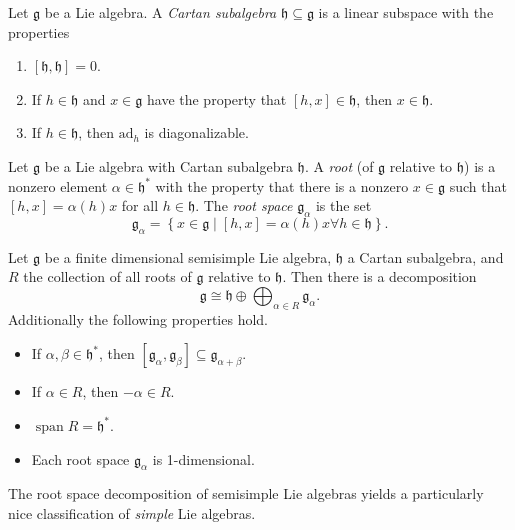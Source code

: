 \documentclass[11pt, letterpaper]{article}
\theoremstyle{plain}
\begin{document}
\begin{definition}\label{dfn:2-4}
	Let $\mathfrak{g} $ be a Lie algebra. A \emph{Cartan subalgebra} $\mathfrak{h} \subseteq \mathfrak{g} $ is a linear subspace with the properties
	\begin{enumerate}[label=(\arabic*), align=right]
		\item $[\mathfrak{h} ,\mathfrak{h} ]=0$.
		\item If $h\in \mathfrak{h} $ and $x\in \mathfrak{g} $ have the property that $[h,x]\in \mathfrak{h} $, then $x\in \mathfrak{h} $.
		\item If $h\in \mathfrak{h} $, then $\mathrm{ad}_h$ is diagonalizable.
	\end{enumerate}
\end{definition}
\begin{definition}\label{dfn:2-5}
	Let $\mathfrak{g} $ be a Lie algebra with Cartan subalgebra $\mathfrak{h} $. A \emph{root} (of $\mathfrak{g} $ relative to $\mathfrak{h} $) is a nonzero element $\alpha \in \mathfrak{h} ^*$ with the property that there is a nonzero $x\in \mathfrak{g} $ such that $[h,x]=\alpha (h)x$ for all $h\in \mathfrak{h} $. The \emph{root space} $\mathfrak{g} _{\alpha } $ is the set
	\[
		\mathfrak{g} _{\alpha } =\left\{ x\in \mathfrak{g} \mid [h,x]=\alpha (h)x \forall h\in \mathfrak{h}  \right\} 
	.\]
\end{definition}
\begin{proposition}\label{prp:2-6}
	Let $\mathfrak{g} $ be a finite dimensional semisimple Lie algebra, $\mathfrak{h} $ a Cartan subalgebra, and $R$ the collection of all roots of $\mathfrak{g} $ relative to $\mathfrak{h} $. Then there is a decomposition
	\[
		\mathfrak{g} \cong \mathfrak{h} \oplus \bigoplus_{\alpha \in R} \mathfrak{g} _{\alpha } 
	.\]
	Additionally the following properties hold.
	\begin{itemize}
		\item If $\alpha ,\beta \in \mathfrak{h}^*$, then $[\mathfrak{g}_\alpha ,\mathfrak{g} _{\beta } ]\subseteq \mathfrak{g} _{\alpha +\beta } $.
		\item If $\alpha \in R$, then $-\alpha \in R$.
		\item $\operatorname{span} R = \mathfrak{h} ^*$.
		\item Each root space $\mathfrak{g} _{\alpha } $ is 1-dimensional.
	\end{itemize}
\end{proposition}

The root space decomposition of semisimple Lie algebras yields a particularly nice classification of \emph{simple} Lie algebras.
\end{document}
